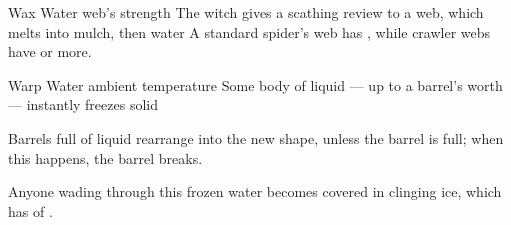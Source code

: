 \ifodd\value{diceNo}

  {}%
  {Wax}%
  {Water}%
  {web's strength}%
  {The \gls{witch} gives a scathing review to a web, which melts into mulch, then water}%
  {A standard spider's web has \tn[3], while \gls{crawler} webs have \tn[10] or more.}

\else

  {}%
  {Warp}%
  {Water}%
  {ambient temperature}%
  {Some body of liquid --- up to a barrel's worth --- instantly freezes solid}%
  {Barrels full of liquid rearrange into the new shape, unless the barrel is full; when this happens, the barrel breaks.

  Anyone wading through this frozen water becomes covered in clinging ice, which has  of .}

\fi
{}
